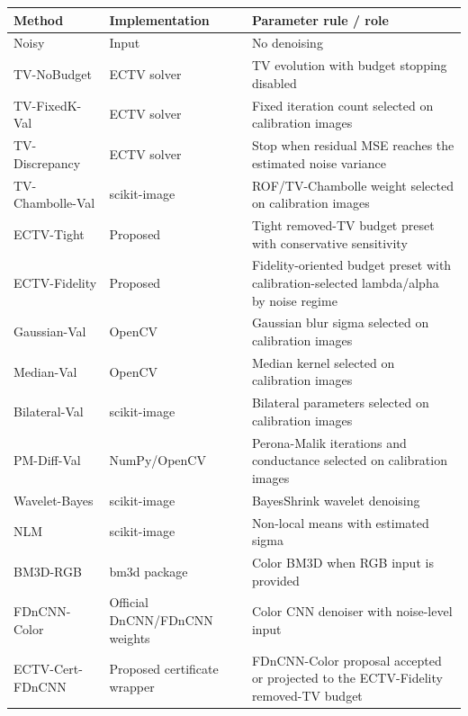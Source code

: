 \begin{tabular}{lp{}p{}}
\toprule
Method & Implementation & Parameter rule / role \\
\midrule
Noisy & Input & No denoising \\
TV-NoBudget & ECTV solver & TV evolution with budget stopping disabled \\
TV-FixedK-Val & ECTV solver & Fixed iteration count selected on calibration images \\
TV-Discrepancy & ECTV solver & Stop when residual MSE reaches the estimated noise variance \\
TV-Chambolle-Val & scikit-image & ROF/TV-Chambolle weight selected on calibration images \\
ECTV-Tight & Proposed & Tight removed-TV budget preset with conservative sensitivity \\
ECTV-Fidelity & Proposed & Fidelity-oriented budget preset with calibration-selected lambda/alpha by noise regime \\
Gaussian-Val & OpenCV & Gaussian blur sigma selected on calibration images \\
Median-Val & OpenCV & Median kernel selected on calibration images \\
Bilateral-Val & scikit-image & Bilateral parameters selected on calibration images \\
PM-Diff-Val & NumPy/OpenCV & Perona-Malik iterations and conductance selected on calibration images \\
Wavelet-Bayes & scikit-image & BayesShrink wavelet denoising \\
NLM & scikit-image & Non-local means with estimated sigma \\
BM3D-RGB & bm3d package & Color BM3D when RGB input is provided \\
FDnCNN-Color & Official DnCNN/FDnCNN weights & Color CNN denoiser with noise-level input \\
ECTV-Cert-FDnCNN & Proposed certificate wrapper & FDnCNN-Color proposal accepted or projected to the ECTV-Fidelity removed-TV budget \\
\bottomrule
\end{tabular}
